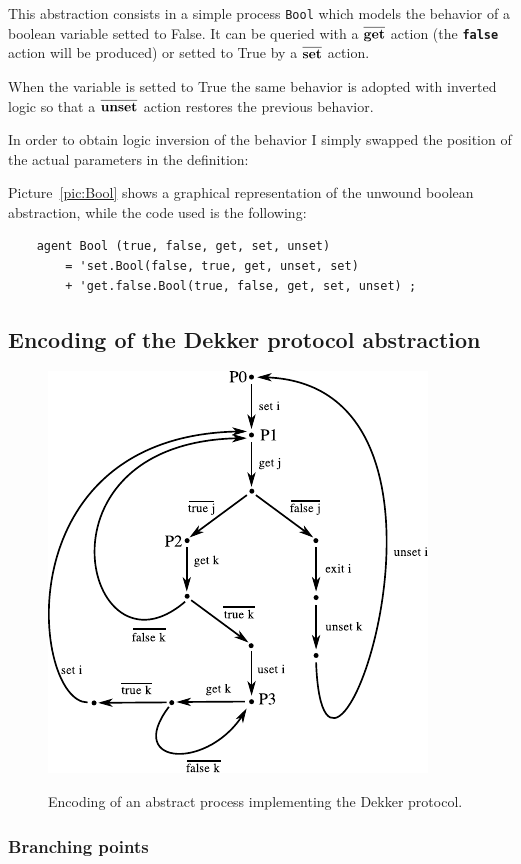 \documentclass[10pt,a4paper]{article}
\newcommand{\Agent}[1]{{\tt {#1}}}
\newcommand{\Action}[1]{{\tt \bf {#1}}}
\newcommand{\CoAction}[1]{$\overline{\mbox{\Action{#1}}}$}
\begin{document}
        This abstraction consists in a simple process \Agent{Bool} which
        models the behavior of a boolean variable setted to False. It can
        be queried with a \CoAction{get} action (the \Action{false} action
        will be produced) or setted to True by a \CoAction{set} action.

        When the variable is setted to True the same behavior is adopted
        with inverted logic so that a \CoAction{unset} action restores the
        previous behavior.

        In order to obtain logic inversion of the behavior I simply
        swapped the position of the actual parameters in the definition:

        Picture~\ref{pic:Bool} shows a graphical representation of the
        unwound boolean abstraction, while the code used is the
        following:
        \begin{verbatim}
    agent Bool (true, false, get, set, unset)
        = 'set.Bool(false, true, get, unset, set)
        + 'get.false.Bool(true, false, get, set, unset) ;
        \end{verbatim}

    \subsection{Encoding of the Dekker protocol abstraction}

        \begin{figure}[htbp]
            \centering
            \includegraphics[width=.5\textwidth]{pics/dekker}
            \label{pic:Dekker}
            \caption{
                Encoding of an abstract process implementing the Dekker
                protocol.
            }
        \end{figure}

        \subsubsection{Branching points}
        \label{subsub:BranchingPoints}
\end{document}
